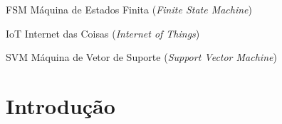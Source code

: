 \documentclass[
    12pt,       %
    oneside,    %
    a4paper,    %
%
    chapter=TITLE,	  	  %
%
    english,			  %
    brazil				  %
%
]{abntex2}
\begin{document}
\begin{siglas}
  \item[FSM] Máquina de Estados Finita (\textit{Finite State Machine})
  \item[IoT] Internet das Coisas (\textit{Internet of Things})
  \item[SVM] Máquina de Vetor de Suporte (\textit{Support Vector Machine})
\end{siglas}


\tableofcontents*
\cleardoublepage{}



\textual{}
\chapter{Introdução}
\label{ch:introducao}

\end{document}
